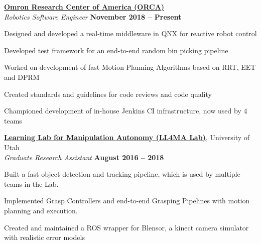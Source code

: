 \documentclass[margin, line]{resume}
\begin{document}
\begin{resume}
    \href{https://www.omron.com/global/americas/usa.html}{\textbf{Omron Research Center of America (ORCA)}} \vspace{1pt}\\\vspace{1pt}%
    \textsl{Robotics Software Engineer} \hfill \textbf{November 2018 -- Present}\\ \vspace{-4.5mm}
    \begin{list2}
        \item Designed and developed a real-time middleware in QNX for reactive robot control
        \item Developed test framework for an end-to-end random bin picking pipeline
        \item Worked on development of fast Motion Planning Algorithms based on RRT, EET and DPRM
        \item Created standards and guidelines for code reviews and code quality
        \item Championed development of in-house Jenkins CI infrastructure, now used by 4 teams
    \end{list2}\vspace{-2.25mm}

    \href{https://robot-learning.cs.utah.edu}{\textbf{Learning Lab for Manipulation Autonomy (LL4MA Lab)}}, University of Utah \vspace{1pt}\\\vspace{1pt}%
    \textsl{Graduate Research Assistant} \hfill \textbf{August 2016 -- 2018}\\ \vspace{-4.5mm}
    \begin{list2}
        \item Built a fast object detection and tracking pipeline, which is
        used by multiple teams in the Lab.
        \item Implemented Grasp Controllers and end-to-end Grasping Pipelines
        with motion planning and execution.
        \item Created and maintained a ROS wrapper for Blensor, a kinect camera
        simulator with realistic error models
    \end{list2}\vspace{-0.1mm}


\end{resume}
\end{document}
